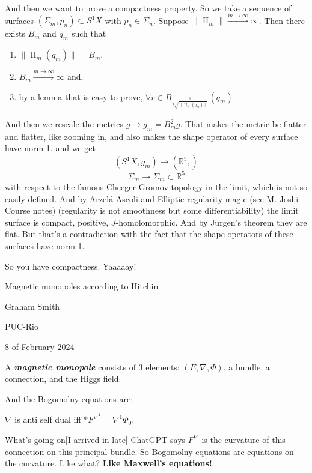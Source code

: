 And then we want to prove a compactness property. So we take a sequence of surfaces $(\Sigma_m,p_n)\subset S^1X$ with $p_n \in \Sigma_n$. Suppose $\|\operatorname{I I}_m\|\xrightarrow{m \to \infty}\infty$. Then there exists $B_m$ and  $q_m$ such that
 \begin{enumerate}[label=(\roman*)]
\item $\| \operatorname{ I I}_m(q_m)\|=B_m$.
\item $B_m\xrightarrow{m \to \infty}\infty$ and,
\item by a lemma that is easy to prove, $\forall  r\in B_{\frac{1}{2\sqrt{\|\operatorname{I I}_m(q_m)\|} }}(q_m)$.
\end{enumerate}
And then we rescale the metrics $g \to g_m=B^2_mg$. That makes the metric be flatter and flatter, like zooming in, and also makes the shape operator of every surface have norm 1. and we get
\[(S^1X,g_m)\longrightarrow(\mathbb{R}^5,)\]
\[\Sigma_m\longrightarrow \Sigma_m \subset\mathbb{R}^5\]
with respect to the famous Cheeger Gromov topology in the limit, which is not so easily defined. And by Arzelá-Ascoli and Elliptic regularity magic (see M. Joshi Course notes) (regularity is not smoothness but some differentiability) the limit surface is compact, positive, $J$-homolomorphic. And by Jurgen's theorem they are flat. But that's a contradiction with the fact that the shape operators of these surfaces have norm 1.

So you have compactness. Yaaaaay!

{\Huge Magnetic monopoles according to Hitchin}

\hfill{\Large Graham Smith}

\hfill{\Large PUC-Rio}

\hfill{\large 8 of February 2024}

\begin{defn}\leavevmode
A \textit{\textbf{magnetic monopole}} consists of 3 elements: \((E,\nabla,\Phi)\), a bundle, a connection, and the Higgs field.
\end{defn}

And the Bogomolny equations are:

\begin{lemma}\leavevmode
\(\nabla\) is anti self dual iff \(* F^{\nabla^1}=\nabla^1\Phi_0\).
\end{lemma}

\begin{thing7}{What's going on}[I arrived in late]\leavevmode
ChatGPT says \(F^\nabla\) is the curvature of this connection on this principal bundle. So Bogomolny equations are equations on the curvature. Like what? \textbf{Like Maxwell's equations!} 
\end{thing7}

